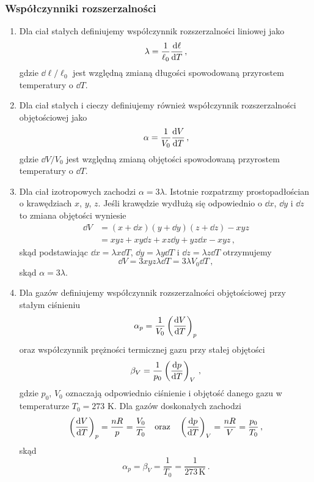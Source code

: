 \documentclass[../main.tex]{subfiles}
\begin{document}
\subsubsection{Współczynniki rozszerzalności}
\begin{enumerate}
    \item Dla ciał stałych definiujemy współczynnik rozszerzalności liniowej jako
\begin{equation*}
    \lambda=\frac{1}{\ell_0}\dv{\ell}{T}\,,
\end{equation*}
gdzie \(\dd\ell/\ell_0\) jest względną zmianą długości spowodowaną przyrostem temperatury o \(\dd{T}\).
\item Dla ciał stałych i cieczy definiujemy również współczynnik rozszerzalności objętościowej jako
\begin{equation*}
    \alpha=\frac{1}{V_0}\dv{V}{T}\,,
\end{equation*}
gdzie \(\dd V/V_0\) jest względną zmianą objętości spowodowaną przyrostem temperatury o \(\dd{T}\).
\item Dla ciał izotropowych zachodzi \(\alpha=3\lambda\). Istotnie rozpatrzmy prostopadłościan o krawędziach \(x\), \(y\), \(z\). Jeśli krawędzie wydłużą się odpowiednio o \(\dd x\), \(\dd y\) i \(\dd z\) to zmiana objętości wyniesie
\begin{equation*}
\begin{split}
    \dd{V}&=(x+\dd x)(y+\dd y)(z+\dd z)-xyz\\
    &=xyz+xy\dd{z}+xz\dd{y}+yz\dd{x}-xyz\,,
\end{split}
\end{equation*}
skąd podstawiając \(\dd{x}=\lambda x\dd{T}\), \(\dd{y}=\lambda y\dd{T}\) i \(\dd{z}=\lambda z\dd{T}\) otrzymujemy
\begin{equation*}
    \dd{V}=3xyz\lambda \dd{T=3\lambda V_0\dd{T}}\,,
\end{equation*}
skąd \(\alpha=3\lambda\).
\item Dla gazów definiujemy współczynnik rozszerzalności objętościowej przy stałym ciśnieniu
\begin{equation*}
    \alpha_p=\frac{1}{V_0}\left(\dv{V}{T}\right)_p
\end{equation*}
oraz współczynnik prężności termicznej gazu przy stałej objętości
\begin{equation*}
    \beta_V=\frac{1}{p_0}\left(\dv{p}{T}\right)_V\,,
\end{equation*}
gdzie \(p_0\), \(V_0\) oznaczają odpowiednio ciśnienie i objętość danego gazu w temperaturze \(T_0=273\) K. Dla gazów doskonałych zachodzi
\begin{equation*}
    \left(\dv{V}{T}\right)_p=\frac{nR}{p}=\frac{V_0}{T_0}\quad\text{oraz}\quad \left(\dv{p}{T}\right)_V=\frac{nR}{V}=\frac{p_0}{T_0}\,,
\end{equation*}
skąd
\begin{equation*}
    \alpha_p=\beta_V=\frac{1}{T_0}=\frac{1}{273\,\text{K}}\,.
\end{equation*}
\end{enumerate}
\end{document}

